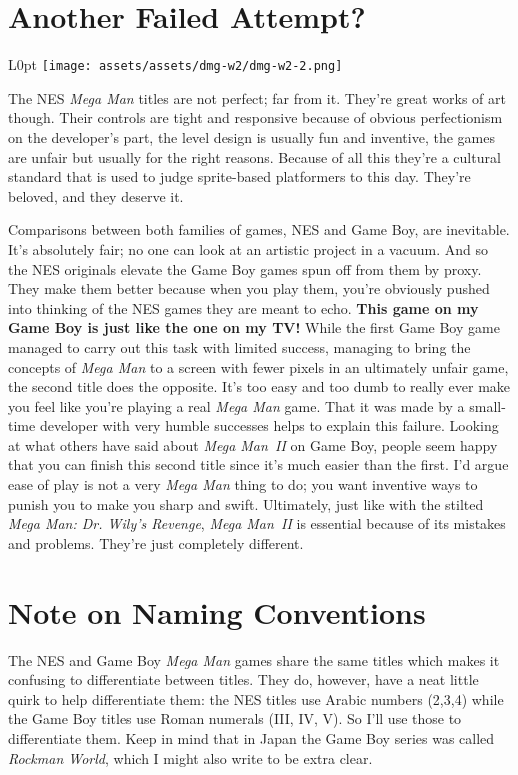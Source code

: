 \documentclass{book}
\begin{document}
\newpage\FloatBarrier\needspace{10mm}\section*{Another Failed Attempt?}\nopagebreak[4]
\begin{wrapfigure}{L}{0pt} \texttt{[image: assets/assets/dmg-w2/dmg-w2-2.png]}\end{wrapfigure}
The NES \emph{Mega Man} titles are not perfect; far from it. They’re great works of art though. Their controls are tight and responsive because of obvious perfectionism on the developer’s part, the level design is usually fun and inventive, the games are unfair but usually for the right reasons. Because of all this they’re a cultural standard that is used to judge sprite-based platformers to this day. They’re beloved, and they deserve it.

Comparisons between both families of games, NES and Game Boy, are inevitable. It’s absolutely fair; no one can look at an artistic project in a vacuum. And so the NES originals elevate the Game Boy games spun off from them by proxy. They make them better because when you play them, you’re obviously pushed into thinking of the NES games they are meant to echo. \textbf{This game on my Game Boy is just like the one on my TV!} While the first Game Boy game managed to carry out this task with limited success, managing to bring the concepts of \emph{Mega Man} to a screen with fewer pixels in an ultimately unfair game, the second title does the opposite. It’s too easy and too dumb to really ever make you feel like you’re playing a real \emph{Mega Man} game. That it was made by a small-time developer with very humble successes helps to explain this failure. Looking at what others have said about \emph{Mega Man~II} on Game Boy, people seem happy that you can finish this second title since it’s much easier than the first. I’d argue ease of play is not a very \emph{Mega Man} thing to do; you want inventive ways to punish you to make you sharp and swift. Ultimately, just like with the stilted \emph{Mega Man: Dr. Wily’s Revenge}, \emph{Mega Man~II} is essential because of its mistakes and problems. They’re just completely different.

\FloatBarrier\needspace{10mm}\section*{Note on Naming Conventions}\nopagebreak[4]

The NES and Game Boy \emph{Mega Man} games share the same titles which makes it confusing to differentiate between titles. They do, however, have a neat little quirk to help differentiate them: the NES titles use Arabic numbers (2,3,4) while the Game Boy titles use Roman numerals (III, IV, V). So I’ll use those to differentiate them. Keep in mind that in Japan the Game Boy series was called \emph{Rockman World}, which I might also write to be extra clear.
\end{document}
